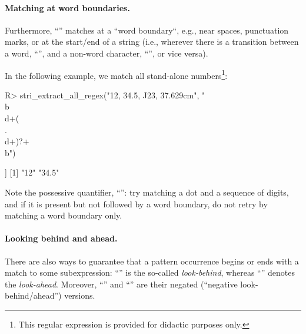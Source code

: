 \documentclass[nojss]{jss}
\begin{document}


\paragraph{Matching at word boundaries.}
Furthermore, ``'' matches
at a ``word boundary``, e.g., near spaces, punctuation marks,
or at the start/end of a string (i.e., wherever there is a transition
between a word, ``'', and a non-word character,
``'', or vice versa).

In the following example, we match
all stand-alone numbers\footnote{This regular expression
is provided for didactic purposes only.}:


\begin{Schunk}
\begin{Sinput}
R> stri_extract_all_regex("12, 34.5, J23, 37.629cm", "\\b\\d+(\\.\\d+)?+\\b")
\end{Sinput}
\begin{Soutput}
[[1]]
[1] "12"   "34.5"
\end{Soutput}
\end{Schunk}

Note the possessive quantifier, ``'':
try matching a dot and a sequence of digits,
and if it is present but not followed by a word boundary,
do not retry by matching a word boundary only.



\paragraph{Looking behind and ahead.}
There are also ways to guarantee that a pattern occurrence
begins or ends with a match to some subexpression:
``'' is the so-called  \textit{look-behind}, whereas
``'' denotes the \textit{look-ahead}.
Moreover, ``'' and ``'' are
their negated (``negative look-behind/ahead'') versions.
\end{document}
